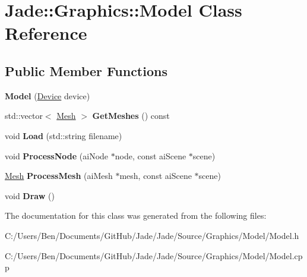 \hypertarget{class_jade_1_1_graphics_1_1_model}{}\section{Jade\+:\+:Graphics\+:\+:Model Class Reference}
\label{class_jade_1_1_graphics_1_1_model}
\subsection*{Public Member Functions}
\begin{DoxyCompactItemize}
\item 
\hypertarget{class_jade_1_1_graphics_1_1_model_af0c53a6b45d446cf763f8a074c384b59}{}{\bfseries Model} (\hyperlink{class_jade_1_1_graphics_1_1_device}{Device} device)\label{class_jade_1_1_graphics_1_1_model_af0c53a6b45d446cf763f8a074c384b59}

\item 
\hypertarget{class_jade_1_1_graphics_1_1_model_a0d85e89daa0e6f60bc16db7dbf045ce2}{}std\+::vector$<$ \hyperlink{class_jade_1_1_graphics_1_1_mesh}{Mesh} $>$ {\bfseries Get\+Meshes} () const \label{class_jade_1_1_graphics_1_1_model_a0d85e89daa0e6f60bc16db7dbf045ce2}

\item 
\hypertarget{class_jade_1_1_graphics_1_1_model_af810f04f7191f97267b43c42a9dbb1f6}{}void {\bfseries Load} (std\+::string filename)\label{class_jade_1_1_graphics_1_1_model_af810f04f7191f97267b43c42a9dbb1f6}

\item 
\hypertarget{class_jade_1_1_graphics_1_1_model_aa9c38bfebead9a12a9a8ea57058e3556}{}void {\bfseries Process\+Node} (ai\+Node $\ast$node, const ai\+Scene $\ast$scene)\label{class_jade_1_1_graphics_1_1_model_aa9c38bfebead9a12a9a8ea57058e3556}

\item 
\hypertarget{class_jade_1_1_graphics_1_1_model_aa05f68cfa64834678aca65e5f71059d6}{}\hyperlink{class_jade_1_1_graphics_1_1_mesh}{Mesh} {\bfseries Process\+Mesh} (ai\+Mesh $\ast$mesh, const ai\+Scene $\ast$scene)\label{class_jade_1_1_graphics_1_1_model_aa05f68cfa64834678aca65e5f71059d6}

\item 
\hypertarget{class_jade_1_1_graphics_1_1_model_a1029b2a86cb0e2c075d30cba6df224ea}{}void {\bfseries Draw} ()\label{class_jade_1_1_graphics_1_1_model_a1029b2a86cb0e2c075d30cba6df224ea}

\end{DoxyCompactItemize}


The documentation for this class was generated from the following files\+:\begin{DoxyCompactItemize}
\item 
C\+:/\+Users/\+Ben/\+Documents/\+Git\+Hub/\+Jade/\+Jade/\+Source/\+Graphics/\+Model/Model.\+h\item 
C\+:/\+Users/\+Ben/\+Documents/\+Git\+Hub/\+Jade/\+Jade/\+Source/\+Graphics/\+Model/Model.\+cpp\end{DoxyCompactItemize}
